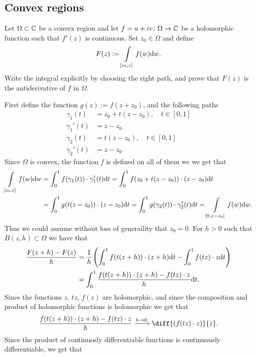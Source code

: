 \documentclass[11pt,a4paper]{article}
\begin{document}
\subsection{Convex regions}
\begin{exercise}
  Let $\Omega \subset \mathbb{C}$ be a convex region
  and let $f = u + i v \colon \Omega \to \mathbb{C}$
  be a holomorphic function such that $f'(z)$ is continuous.
  Set $z_0 \in \Omega$ and define
  \[
    F(z) := \int\limits_{[z_0,z]} f(w) \mathrm{d} w.
  \]
  Write the integral explicitly by choosing the right path, and prove
  that $F(z)$ is the antiderivative of $f$ in $\Omega$.
\end{exercise}
\begin{solution}
  First define the function $g(z) := f(z + z_0)$, and the following paths
  \begin{align*}
    \gamma_1(t) &= z_0 + t(z - z_0), \quad t \in [0,1] \\
    \gamma_1'(t) &= z - z_0 \\
    \gamma_2(t) &= t(z - z_0), \quad t \in [0,1] \\
    \gamma_2'(t) &= z - z_0
  \end{align*}
  Since $\Omega$ is convex, the function $f$ is defined on all of them we
  we get that
  \begin{align*}
    \int\limits_{[z_0,z]} f(w) \mathrm{d} w &=
    \int_{0}^{1} f(\gamma_1(t)) \cdot \gamma_1'(t) \mathrm{d} t =
    \int_{0}^{1} f(z_0 + t(z - z_0)) \cdot (z - z_0) \mathrm{d} t \\ &=
    \int_{0}^{1} g(t(z - z_0)) \cdot (z - z_0) \mathrm{d} t =
    \int_{0}^{1} g(\gamma_2(t)) \cdot \gamma_2'(t) \mathrm{d} t =
    \int\limits_{[0,z-z_0]} f(w) \mathrm{d} w.
  \end{align*}
  Thus we could assume without loss of generaility that $z_0 = 0$.
  For $h > 0$ such that $B(z,h) \subset \Omega$ we have that
  \begin{align*}
    \frac{F(z + h) - F(z)}{h} &=
    \frac{1}{h} \del{\int_{0}^{1} f(t(z + h)) \cdot
    (z + h) \dt - \int_{0}^{1} f(tz) \cdot z \dt} \\ &=
    \int_{0}^{1} \frac{f(t(z + h)) \cdot (z + h) - f(tz) \cdot z}{h} \dt.
  \end{align*}
  Since the functions $z$, $tz$, $f(z)$ are holomorphic, and since
  the composition and product of holomorphic functions is holomorphic we
  get that
  \[
    \frac{f(t(z + h)) \cdot (z + h) - f(tz) \cdot z}{h}
    \taking{h \to 0} \diff{{(f(tz) \cdot z)}}{z}.
  \]
  Since the product of continuosly differentiable functions is continuously
  differentiable, we get that

\end{solution}
\end{document}
